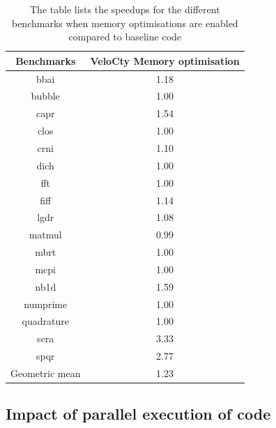 \begin{table}[h]
\centering
\begin{tabular}{|c|c|}
\hline
Benchmarks     & VeloCty Memory optimisation \\ \hline
bbai           & 1.18                        \\ \hline
bubble         & 1.00                        \\ \hline
capr           & 1.54                        \\ \hline
clos           & 1.00                        \\ \hline
crni           & 1.10                        \\ \hline
dich           & 1.00                        \\ \hline
fft            & 1.00                        \\ \hline
fiff           & 1.14                        \\ \hline
lgdr           & 1.08                        \\ \hline
matmul         & 0.99                        \\ \hline
mbrt           & 1.00                        \\ \hline
mcpi           & 1.00                        \\ \hline
nb1d           & 1.59                        \\ \hline
numprime       & 1.00                        \\ \hline
quadrature     & 1.00                        \\ \hline
scra           & 3.33                        \\ \hline
spqr           & 2.77                        \\ \hline
Geometric mean & 1.23                        \\ \hline
\end{tabular}
\caption[Speedup of \velocty code when memory optimisations are enabled]{The table lists the speedups for the different \matlab benchmarks when memory optimisations are enabled compared to baseline \velocty code}
\label{tab:cmvscwo}
\end{table}
\subsection{Impact of parallel execution of \velocty code}

